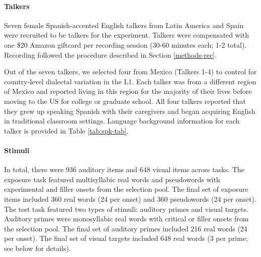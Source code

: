 \documentclass[
  12pt,
  twoside]{article}
\begin{document}
\hypertarget{methods-talk-1a}{%
\paragraph{Talkers}\label{methods-talk-1a}}

Seven female Spanish-accented English talkers from Latin America and Spain were recruited to be talkers for the experiment.
Talkers were compensated with one \$20 Amazon giftcard per recording session (30-60 minutes each; 1-2 total).
Recording followed the procedure described in Section \ref{methods-rec}.

Out of the seven talkers, we selected four from Mexico (Talkers 1-4) to control for country-level dialectal variation in the L1.
Each talker was from a different region of Mexico and reported living in this region for the majority of their lives before moving to the US for college or graduate school.
All four talkers reported that they grew up speaking Spanish with their caregivers and began acquiring English in traditional classroom settings.
Language background information for each talker is provided in Table \ref{tab:spk-tab}.

\begin{table}

\caption{\label{tab:spk-tab}Talker background information.}
\centering
{}
\end{table}

\hypertarget{methods-stims-1a}{%
\paragraph{Stimuli}\label{methods-stims-1a}}

In total, there were 936 auditory items and 648 visual items across tasks.
The exposure task featured multisyllabic real words and pseudowords with experimental and filler onsets from the selection pool.
The final set of exposure items included 360 real words (24 per onset) and 360 pseudowords (24 per onset).
The test task featured two types of stimuli: auditory primes and visual targets.
Auditory primes were monosyllabic real words with critical or filler onsets from the selection pool.
The final set of auditory primes included 216 real words (24 per onset).
The final set of visual targets included 648 real words (3 per prime; see below for details).
\end{document}
